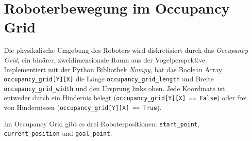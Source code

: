 \vspace*{-5cm}
\chapter{Roboterbewegung im Occupancy Grid}
Die physikalische Umgebung des Roboters wird diskretisiert durch das \textit{Occupancy Grid}, ein binärer, zweidimensionale Raum aus der Vogelperspektive. Implementiert mit der Python Bibliothek \textit{Numpy}, hat das Boolean Array \texttt{occupancy\_grid[Y][X]} die Länge \texttt{occupancy\_grid\_length} und Breite \texttt{occupancy\_grid\_width} und den Ursprung links oben. Jede Koordinate ist entweder durch ein Hindernis belegt (\texttt{occupancy\_grid[Y][X] == False}) oder frei von Hindernissen (\texttt{occupancy\_grid[Y][X] == True}).

Im Occupancy Grid gibt es drei Roboterpositionen: \texttt{start\_point}, \texttt{current\_position} und \texttt{goal\_point}.
